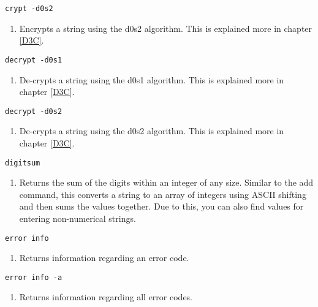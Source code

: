 \begin{lstlisting} 
crypt -d0s2  
\end{lstlisting}
\begin{enumerate}
	\item[] Encrypts a string using the d0s2 algorithm. This is explained more in chapter \ref{D3C}.
\end{enumerate}

\begin{lstlisting} 
decrypt -d0s1   
\end{lstlisting}
\begin{enumerate}
	\item[] De-crypts a string using the d0s1 algorithm. This is explained more in chapter \ref{D3C}.
\end{enumerate}


\begin{lstlisting} 
decrypt -d0s2   
\end{lstlisting}
\begin{enumerate}
	\item[] De-crypts a string using the d0s2 algorithm. This is explained more in chapter \ref{D3C}.
\end{enumerate}

\begin{lstlisting} 
digitsum 
\end{lstlisting}
\begin{enumerate}
	\item[] Returns the sum of the digits within an integer of any size. Similar to the add command, this converts a string to an array of integers using ASCII shifting and then sums the values together. Due to this, you can also find values for entering non-numerical strings.
\end{enumerate}

\begin{lstlisting} 
error info
\end{lstlisting}
\begin{enumerate}
	\item[] Returns information regarding an error code.
\end{enumerate}

\begin{lstlisting} 
error info -a
\end{lstlisting}
\begin{enumerate}
\item[] Returns information regarding all error codes.
\end{enumerate}

